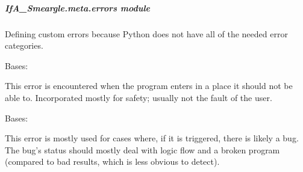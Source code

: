 \documentclass[letterpaper,10pt,english]{sphinxmanual}
\begin{document}
\subparagraph{IfA\_Smeargle.meta.errors module}
\label{\detokenize{python_docstrings/IfA_Smeargle.meta.errors:module-IfA_Smeargle.meta.errors}}\label{\detokenize{python_docstrings/IfA_Smeargle.meta.errors:ifa-smeargle-meta-errors-module}}\label{\detokenize{python_docstrings/IfA_Smeargle.meta.errors::doc}}
Defining custom errors because Python does not have all of the needed error
categories.

\begin{fulllineitems}
\label{\detokenize{python_docstrings/IfA_Smeargle.meta.errors:IfA_Smeargle.meta.errors.BrokenLogicError}}
Bases: {\hyperref[\detokenize{python_docstrings/IfA_Smeargle.meta.errors:IfA_Smeargle.meta.errors.Smeargle_BaseException}]{}}

This error is encountered when the program enters in a place it should
not be able to. Incorporated mostly for safety; usually not the fault of
the user.

\end{fulllineitems}


\begin{fulllineitems}
\label{\detokenize{python_docstrings/IfA_Smeargle.meta.errors:IfA_Smeargle.meta.errors.BugError}}
Bases: {\hyperref[\detokenize{python_docstrings/IfA_Smeargle.meta.errors:IfA_Smeargle.meta.errors.Smeargle_BaseException}]{}}

This error is mostly used for cases where, if it is triggered, there is
likely a bug. The bug’s status should mostly deal with logic flow and a
broken program (compared to bad results, which is less obvious to detect).

\end{fulllineitems}

\end{document}
